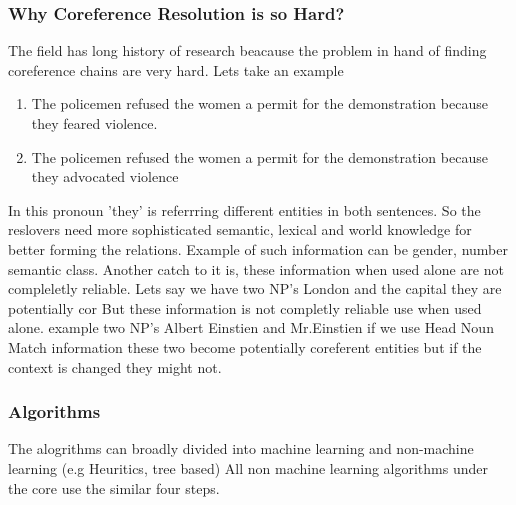 \documentclass[11pt]{article}
\begin{document}
\subsubsection{Why Coreference Resolution is so Hard?}
The field has long history of research beacause the problem in hand of finding coreference chains are very hard. Lets take an example
\begin {enumerate}

\item The policemen refused the women a permit for the demonstration because they feared violence.
\item The policemen refused the women a permit for the demonstration because they advocated violence

\end {enumerate}
In this pronoun 'they' is referrring  different entities in both sentences. So the reslovers need more sophisticated semantic, lexical and world knowledge for better forming the relations. Example of such information can be gender, number semantic class. Another catch to it is, these information when used alone are not compleletly reliable. Lets say we have two NP's London and the capital they are potentially cor
But these information is not completly reliable use when used alone. example two NP's Albert Einstien and Mr.Einstien if we use Head Noun Match information these two become potentially coreferent entities but if the context is changed they might not.

\subsubsection{Algorithms}
The alogrithms can broadly divided into machine learning and non-machine learning (e.g Heuritics, tree based)
All non machine learning algorithms under the core use the similar four steps. 
\end{document}
